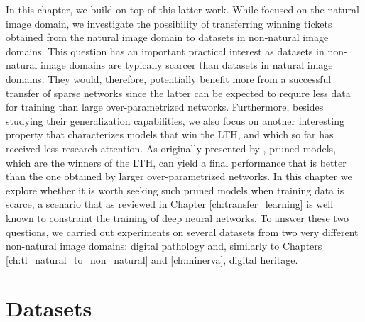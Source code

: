 In this chapter, we build on top of this latter work. While \citet{morcos2019one} focused on the natural image domain, we investigate the possibility of transferring winning tickets obtained from the natural image domain to datasets in non-natural image domains. This question has an important practical interest as datasets in non-natural image domains are typically scarcer than datasets in natural image domains. They would, therefore, potentially benefit more from a successful transfer of sparse networks since the latter can be expected to require less data for training than large over-parametrized networks. Furthermore, besides studying their generalization capabilities, we also focus on another interesting property that characterizes models that win the LTH, and which so far has received less research attention. As originally presented by \citet{frankle2018lottery}, pruned models, which are the winners of the LTH, can yield a final performance that is better than the one obtained by larger over-parametrized networks. In this chapter we explore whether it is worth seeking such pruned models when training data is scarce, a scenario that as reviewed in Chapter \ref{ch:transfer_learning} is well known to constraint the training of deep neural networks. To answer these two questions, we carried out experiments on several datasets from two very different non-natural image domains: digital pathology and, similarly to Chapters \ref{ch:tl_natural_to_non_natural} and \ref{ch:minerva}, digital heritage.

\section{Datasets}
\label{sec:datasets}

